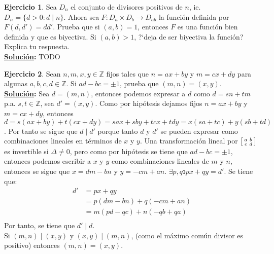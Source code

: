 \documentclass[11pt,letterpaper]{article}
\theoremstyle{definition}\newtheorem{p}{Ejercicio}
\theoremstyle{definition}\newtheorem{pp}[p]{$(*)$Ejercicio}
\numberwithin{p}{section}
\newcommand{\Z}{\mathbb{Z}}
\newcommand{\ra}{\rightarrow}
\newcommand{\sol}{\textbf{\underline{Solución}: }} %
\begin{document}
%
\begin{p}
  Sea $D_n$ el conjunto de divisores positivos de $n$, ie. $D_n=\{d>0 : d\mid n\}$. Ahora sea
  $F:D_a\times D_b\ra D_{ab}$ la funci\'on definida por $F(d,d')=dd'$. Prueba que si $(a,b)=1$, entonces $F$ es
  una funci\'on bien definida y que es biyectiva. Si $(a,b)>1$, ?`deja de ser biyectiva la funci\'on? Explica tu
  respuesta.\\
  \sol TODO
\end{p}
%
\begin{p}
  Sean $n,m,x,y\in\Z$ fijos tales que $n=ax+by$ y $m=cx+dy$ para algunas $a,b,c,d\in\Z$. Si $ad-bc=\pm 1$, prueba
  que $(m,n)=(x,y)$.\\
  \sol Sea $d=(m,n)$, entonces podemos expresar a $d$ como $d=sn+tm$ p.a. $s,t \in \Z$, sea 
  $d'=(x,y)$. Como por hipótesis  dejamos fijos $n=ax+by$ y $m=cx+dy$, entonces 
  $d=s(ax+by)+t(cx+dy)=sax+sby+tcx+tdy=x(sa+tc)+y(sb+td)$. Por tanto se sigue que $d \mid d'$ 
  porque tanto $d$ y $d'$ se pueden expresar como combinaciones lineales en términos de $x$ y $y$.
  Una transformación lineal por $\begin{bsmallmatrix}a&b\\c&d\end{bsmallmatrix}$
  es invertible si $\Delta \neq 0$, pero como por hipótesis se tiene que $ad-bc=\pm 1$, entonces 
  podemos escribir a $x$ y $y$ como combinaciones lineales de $m$ y $n$, entonces se sigue que 
  $x=dm-bn$ y $y=-cm+an$. $\exists p, q \backepsilon px + qy = d'$.
  Se tiene que:
  \begin{align*}
  d'
    &= px + qy \\
    &= p(dm-bn) + q(-cm+an) \\
    &= m(pd-qc) + n(-qb+qa) \\
  \end{align*}
  Por tanto, se tiene que $d' \mid d$.\\
  Si $(m,n) \mid (x, y)$ y $(x, y) \mid (m,n)$, (como el máximo común divisor es positivo) 
  entonces $(m,n)=(x,y)$.
\end{p}
%
\end{document}

